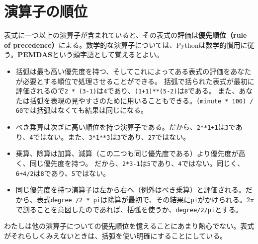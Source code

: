 \documentclass[a4j,12pt,makeidx]{jbook}
\begin{document}
\section{演算子の順位}
表式に一つ以上の演算子が含まれていると、その表式の評価は{\bf 優先順位（rule of precedence）}による。数学的な演算子については、Pythonは数学的慣用に従う。{\bf PEMDAS}という頭字語として覚えるとよい。
\begin{itemize}
\item 括弧は最も高い優先度を持つ、そしてこれによってある表式の評価をあなたが必要とする順位で処理させることができる。
括弧で括られた表式が最初に評価されるので{\tt 2 * (3-1)}は{\tt 4}であり、{\tt (1+1)**(5-2)}は{\tt 8}である。
また、あなたは括弧を表現の見やすさのために用いることもできる。{\tt (minute * 100) / 60}では括弧はなくても結果は同じになる。
\item べき乗算は次ぎに高い順位を持つ演算子である。だから、{\tt 2**1+1}は{\tt 3}であり、{\tt 4}ではない。また、{\tt 3*1**3}は{\tt 3}であり、{\tt 27}ではない。
\item 乗算、除算は加算、減算（この二つも同じ優先度である）より優先度が高く、同じ優先度を持つ。
だから、{\tt 2*3-1}は{\tt 5}であり、{\tt 4}ではない。同じく、{\tt 6+4/2}は{\tt 8}であり、{\tt 5}ではない。
\item 同じ優先度を持つ演算子は左から右へ（例外はべき乗算）と評価される。だから、表式{\tt degree /2 * pi}は除算が最初で、その結果に{\tt pi}がかけられる。$2\pi$で割ることを意図したのであれば、括弧を使うか、{\tt degree/2/pi}とする。
\end{itemize}
わたしは他の演算子についての優先順位を憶えることにあまり熱心でない。表式がそれらしくみえないときは、括弧を使い明確にすることにしている。
%
\end{document}
